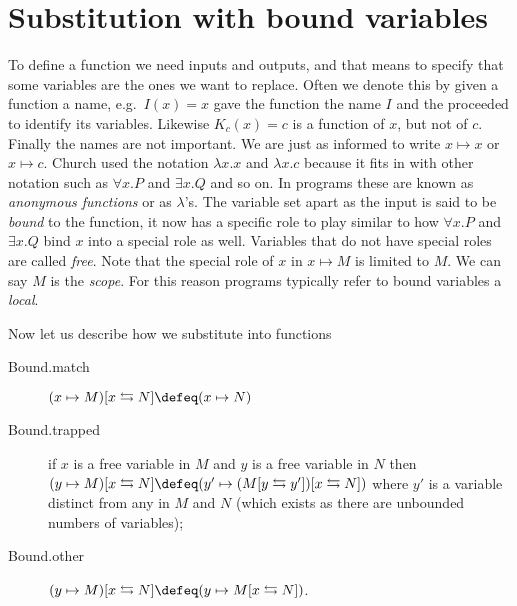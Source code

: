 \section{Substitution with bound variables}
To define a function we need inputs and outputs, and that means to specify that
some variables are the ones we want to replace.  Often we denote this by given a
function a name, e.g.\ $I(x)=x$ gave the function the name $I$ and the proceeded
to identify its variables. Likewise $K_c(x)=c$ is a function of $x$, but not of
$c$.  Finally the names are not important.  We are just as informed to write
$x\mapsto x$ or $x\mapsto c$.  Church used the notation $\lambda x.x$ and
$\lambda x.c$ because it fits in with other notation such as $\forall x.P$ and
$\exists x.Q$ and so on.  In programs these are known as \emph{anonymous
functions} or as $\lambda$'s.   The variable set apart as the input is said to
be \emph{bound} to the function, it now has a specific role to play similar to
how $\forall x.P$  and $\exists x.Q$ bind $x$ into a special role as well.
Variables that do not have special roles are called \emph{free}.  Note that the
special role of $x$ in $x\mapsto M$ is limited to $M$.  We can say $M$ is the
\emph{scope}.  For this reason programs typically refer to bound variables a
\emph{local}.

Now let us describe how we substitute into functions
\begin{description}
    \item[Bound.match] $(x\mapsto M)[x\leftrightarrows N]\defeq (x\mapsto N)$
    \item[Bound.trapped]
    if $x$ is a free variable in $M$ and $y$ is a free variable in $N$ then 
    $(y\mapsto M)[x\leftrightarrows N]\defeq (y'\mapsto (M[y\leftrightarrows y'])[x\leftrightarrows N])$ where 
    $y'$ is a variable distinct from any in $M$ and $N$ (which exists 
    as there are unbounded numbers of variables);

    \item[Bound.other] $(y\mapsto M)[x\leftrightarrows N]\defeq (y\mapsto M[x\leftrightarrows N])$.
\end{description}


